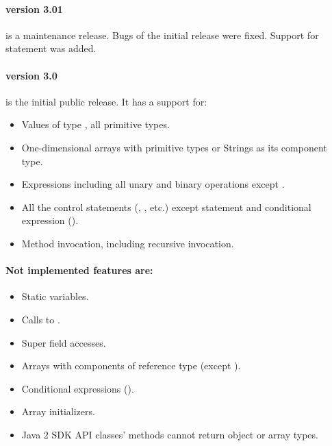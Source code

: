 \paragraph{version 3.01} is a maintenance release. Bugs of the initial
release were fixed. Support for  statement was added.

\paragraph{version 3.0} is the initial public release. It has a support for:
\begin{itemize}
\item Values of type , all primitive types.
\item One-dimensional arrays with primitive types or Strings as its component type.
\item Expressions including all unary and binary operations except .
\item All the control statements (, , etc.) except  statement
and conditional expression ().
\item Method invocation, including recursive invocation.
\end{itemize}

\paragraph{Not implemented features are:}
\begin{itemize}
\item Static variables.
\item Calls to .
\item Super field accesses.
\item Arrays with components of reference type (except ).
\item Conditional expressions ().
\item Array initializers.
\item Java 2 SDK API classes' methods cannot return object or array types.
\end{itemize}
